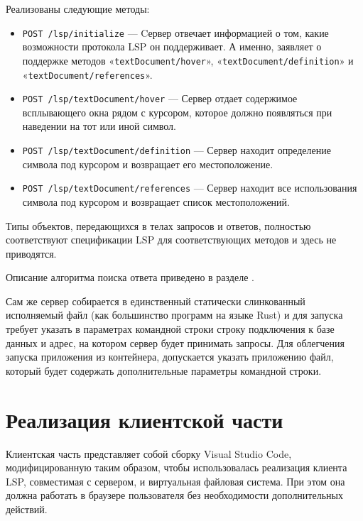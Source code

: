 Реализованы следующие методы:

\begin{itemize}
    \item \texttt{POST /lsp/initialize} — Cервер отвечает информацией о том, какие возможности протокола LSP он поддерживает. А именно, заявляет о поддержке методов «\texttt{textDocument/hover}», «\texttt{textDocument/definition}» и «\texttt{textDocument/references}».
    \item \texttt{POST /lsp/textDocument/hover} — Сервер отдает содержимое всплывающего окна рядом с курсором, которое должно появляться при наведении на тот или иной символ.
    \item \texttt{POST /lsp/textDocument/definition} — Сервер находит определение символа под курсором и возвращает его местоположение.
    \item \texttt{POST /lsp/textDocument/references} — Сервер находит все использования символа под курсором и возвращает список местоположений.
\end{itemize}

Типы объектов, передающихся в телах запросов и ответов, полностью соответствуют спецификации LSP \cite{languageserver} для соответствующих методов и здесь не приводятся.

Описание алгоритма поиска ответа приведено в разделе .

Сам же сервер собирается в единственный статически слинкованный исполняемый файл (как большинство программ на языке Rust) и для запуска требует указать в параметрах командной строки строку подключения к базе данных и адрес, на котором сервер будет принимать запросы. Для облегчения запуска приложения из контейнера, допускается указать приложению файл, который будет содержать дополнительные параметры командной строки.

\section{Реализация клиентской части}
\label{section:frontend-impl}

Клиентская часть представляет собой сборку Visual Studio Code, модифицированную таким образом, чтобы использовалась реализация клиента LSP, совместимая с сервером, и виртуальная файловая система. При этом она должна работать в браузере пользователя без необходимости дополнительных действий.


